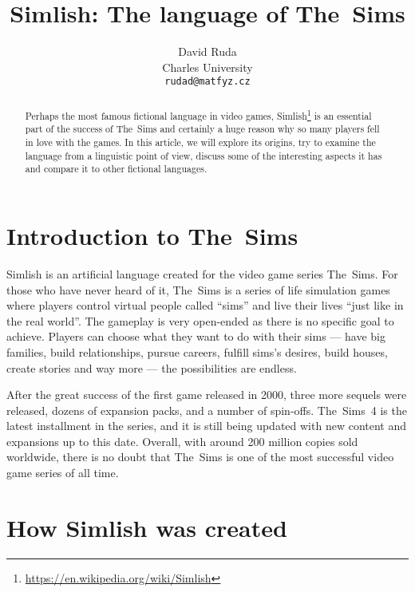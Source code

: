\documentclass[11pt]{article}
\title{Simlish: The language of The~Sims}
\author{David Ruda \\
  Charles University \\
  \texttt{rudad@matfyz.cz}
}
\begin{document}
\maketitle
\begin{abstract}
Perhaps the most famous fictional language in video games, Simlish\footnote{\url{https://en.wikipedia.org/wiki/Simlish}} is an essential part of the success of The~Sims and certainly a huge reason why so many players fell in love with the games.
In this article, we will explore its origins, try to examine the language from a linguistic point of view, discuss some of the interesting aspects it has and compare it to other fictional languages.
\end{abstract}

\section*{Introduction to The~Sims}

Simlish is an artificial language created for the video game series The~Sims.
For those who have never heard of it,
The~Sims is a series of life simulation games where players control virtual people called ``sims'' and live their lives ``just like in the real world''. The gameplay is very open-ended as there is no specific goal to achieve. Players can choose what they want to do with their sims --- have big families, build relationships, pursue careers, fulfill sims's desires, build houses, create stories and way more --- the possibilities are endless.

After the great success of the first game released in 2000, three more sequels were released, dozens of expansion packs, and a number of spin-offs.
The~Sims~4 is the latest installment in the series, and it is still being updated with new content and expansions up to this date.
Overall, with around 200 million copies sold worldwide, there is no doubt that The~Sims is one of the most successful video game series of all time.

\section*{How Simlish was created}
\end{document}
